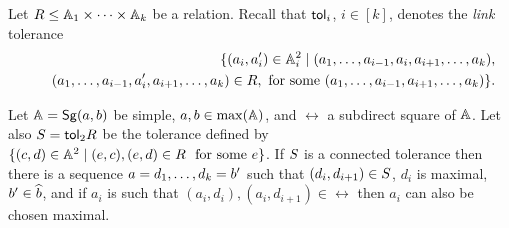 \documentclass[11pt]{article}
\begin{document}
Let $R\le{\mathbb A}_1\times\dots\times{\mathbb A}_k$ be a relation. Recall that ${\sf tol}_i$, $i\in[k]$,  denotes
the \emph{link} tolerance 
\begin{eqnarray*}
&& \{(a_i,a'_i)\in{\mathbb A}_i^2\mid (a_1,\ldots, a_{i-1},a_i,a_{i+1},\ldots, a_k),\\
&& \quad 
(a_1,\ldots, a_{i-1},a'_i,a_{i+1},\ldots, a_k)\in R, \text{ for some 
$(a_1,\ldots, a_{i-1},a_{i+1},\ldots, a_k)$}\}.
\end{eqnarray*}


\begin{lemma}\label{lem:going-maximal}
Let ${\mathbb A}={\sf Sg}(a,b)$ be simple, $a,b\in\max({\mathbb A})$, and $\rel$ a
subdirect square of ${\mathbb A}$. Let also $S={\sf tol}_2R$ be the tolerance defined
by $\{(c,d)\in{\mathbb A}^2\mid (e,c),(e,d)\in R\ \text{ for some } e\}$. If
$S$ is a connected tolerance then there is a sequence $a=d_1,\ldots,
d_k=b'$ such that $(d_i,d_{i+1})\in S$, $d_i$ is maximal, $b'\in\widehat
b$, and if $a_i$ is such that $(a_i,d_i),(a_i,d_{i+1})\in\rel$ then
$a_i$ can also be chosen maximal. 
\end{lemma}
\end{document}

